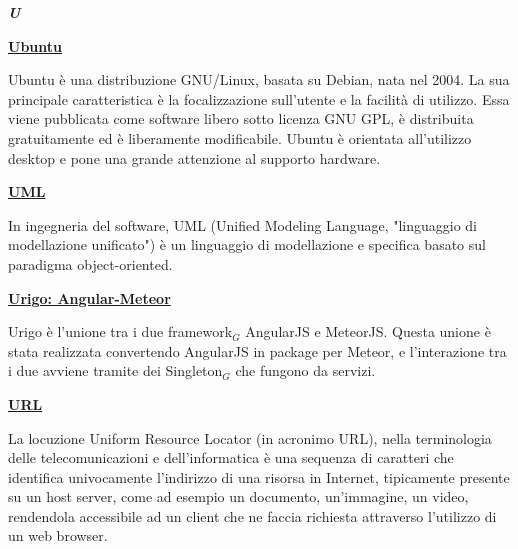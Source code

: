 \newpage

\cleardoublepage
{}
{}
\noindent\hrulefill\hspace{4mm}\textbf{\textsl{\Huge{U}}}\hspace{4mm}\hrulefill
\vspace*{2\bigskipamount}	

\begin{addmargin}[0em]{0em}
	\textbf{\underline{Ubuntu}}
\end{addmargin}

\medskip
\begin{addmargin}[5em]{1em}
Ubuntu è una distribuzione GNU/Linux, basata su Debian, nata nel 2004. La sua principale caratteristica è la focalizzazione sull'utente e la facilità di utilizzo. Essa viene pubblicata come software libero sotto licenza GNU GPL, è distribuita gratuitamente ed è liberamente modificabile. Ubuntu è orientata all'utilizzo desktop e pone una grande attenzione al supporto hardware.
\end{addmargin}	

\bigskip
\begin{addmargin}[0em]{0em}	
	\textbf{\underline{UML}}
\end{addmargin}

\medskip
\begin{addmargin}[5em]{1em}
In ingegneria del software, UML (Unified Modeling Language, "linguaggio di modellazione unificato") è un linguaggio di modellazione e specifica basato sul paradigma object-oriented.
\end{addmargin}	

\bigskip
\begin{addmargin}[0em]{0em}	
	\textbf{\underline{Urigo: Angular-Meteor}}
\end{addmargin}

\medskip
\begin{addmargin}[5em]{1em}
Urigo è l'unione tra i due framework$_G$ AngularJS e MeteorJS. Questa unione è stata realizzata convertendo AngularJS in package per Meteor, e l'interazione tra i due avviene tramite dei Singleton$_G$ che fungono da servizi.
\end{addmargin}

\bigskip
\begin{addmargin}[0em]{0em}	
	\textbf{\underline{URL}}
\end{addmargin}

\medskip
\begin{addmargin}[5em]{1em}
La locuzione Uniform Resource Locator (in acronimo URL), nella terminologia delle telecomunicazioni e dell'informatica è una sequenza di caratteri che identifica univocamente l'indirizzo di una risorsa in Internet, tipicamente presente su un host server, come ad esempio un documento, un'immagine, un video, rendendola accessibile ad un client che ne faccia richiesta attraverso l'utilizzo di un web browser.
\end{addmargin}
 
